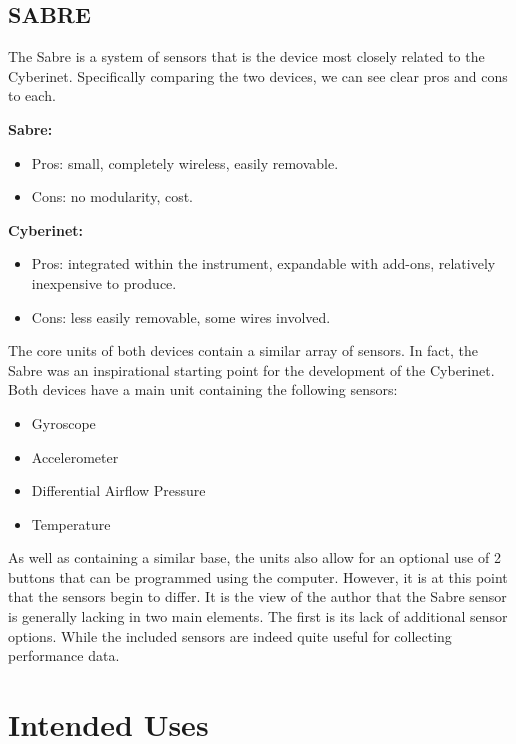 \section{SABRE}
The Sabre is a system of sensors that is the device most closely related to the Cyberinet. Specifically comparing the two devices, we can see clear pros and cons to each.

\textbf{Sabre:}

\begin{itemize}
    \item Pros: small, completely wireless, easily removable.
    \item Cons: no modularity, cost.
\end{itemize}

\textbf{Cyberinet:} 

\begin{itemize}
    \item Pros: integrated within the instrument, expandable with add-ons, relatively inexpensive to produce.
    \item Cons: less easily removable, some wires involved.
\end{itemize}

The core units of both devices contain a similar array of sensors. In fact, the Sabre was an inspirational starting point for the development of the Cyberinet. Both devices have a main unit containing the following sensors:

\begin{itemize}
    \item Gyroscope
    \item Accelerometer 
    \item Differential Airflow Pressure
    \item Temperature
\end{itemize}

As well as containing a similar base, the units also allow for an optional use of 2 buttons that can be programmed using the computer. However, it is at this point that the sensors begin to differ. It is the view of the author that the Sabre sensor is generally lacking in two main elements. The first is its lack of additional sensor options. While the included sensors are indeed quite useful for collecting performance data.

\chapter{Intended Uses}

